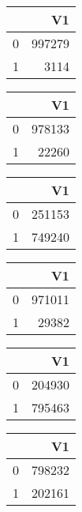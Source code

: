 \bigskip\bigskip
\centering
\begin{tabular}{rr}
  \hline
 & V1 \\ 
  \hline
0 & 997279 \\ 
  1 & 3114 \\ 
   \hline
\end{tabular}

\bigskip\bigskip
\centering
\begin{tabular}{rr}
  \hline
 & V1 \\ 
  \hline
0 & 978133 \\ 
  1 & 22260 \\ 
   \hline
\end{tabular}

\bigskip\bigskip
\centering
\begin{tabular}{rr}
  \hline
 & V1 \\ 
  \hline
0 & 251153 \\ 
  1 & 749240 \\ 
   \hline
\end{tabular}

\bigskip\bigskip
\centering
\begin{tabular}{rr}
  \hline
 & V1 \\ 
  \hline
0 & 971011 \\ 
  1 & 29382 \\ 
   \hline
\end{tabular}

\bigskip\bigskip
\centering
\begin{tabular}{rr}
  \hline
 & V1 \\ 
  \hline
0 & 204930 \\ 
  1 & 795463 \\ 
   \hline
\end{tabular}

\bigskip\bigskip
\centering
\begin{tabular}{rr}
  \hline
 & V1 \\ 
  \hline
0 & 798232 \\ 
  1 & 202161 \\ 
   \hline
\end{tabular}

